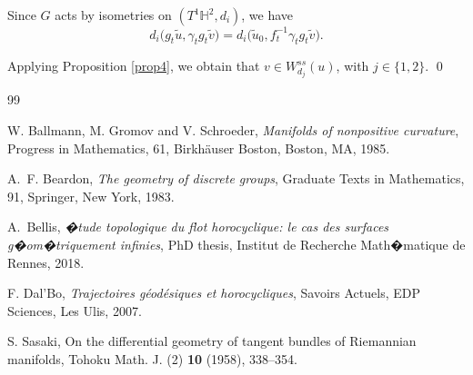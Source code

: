 \documentclass[a4paper,english,reqno]{amsart}
\theoremstyle{definition}
\numberwithin{equation}{section}
\begin{document}
Since $G$ acts by isometries on $(T^{1}\mathbb H^{2},d_{i})$, we have
\[
d_{i}\bigl(g_{t}\tilde u,\gamma_{t}g_{t}\tilde v\bigr)
=
d_{i}\bigl(\tilde u_{0},f_{t}^{-1}\gamma_{t}g_{t}\tilde v\bigr).
\]

Applying Proposition \ref{prop4}, we obtain that $v\in W_{d_{j}}^{ss}(u)$, with
$
j\in\{1,2\}.
$
\qed

	
	
	
\begin{thebibliography}{99}
	
	
	W. Ballmann, M. Gromov and V. Schroeder, {\it Manifolds of nonpositive curvature}, Progress in Mathematics, 61, Birkh\"auser Boston, Boston, MA, 1985.
	
	A.~F. Beardon, {\it The geometry of discrete groups}, Graduate Texts in Mathematics, 91, Springer, New York, 1983.
	
	A.~Bellis,
	\emph{�tude topologique du flot horocyclique: le cas des surfaces g�om�triquement infinies},
	PhD thesis, Institut de Recherche Math�matique de Rennes, 2018.
	

	F. Dal'Bo, {\it Trajectoires g\'eod\'esiques et horocycliques}, Savoirs Actuels, EDP Sciences, Les Ulis, 2007.

	S. Sasaki, On the differential geometry of tangent bundles of Riemannian manifolds, Tohoku Math. J. (2) {\bf 10} (1958), 338--354.


\end{thebibliography}
\end{document}
